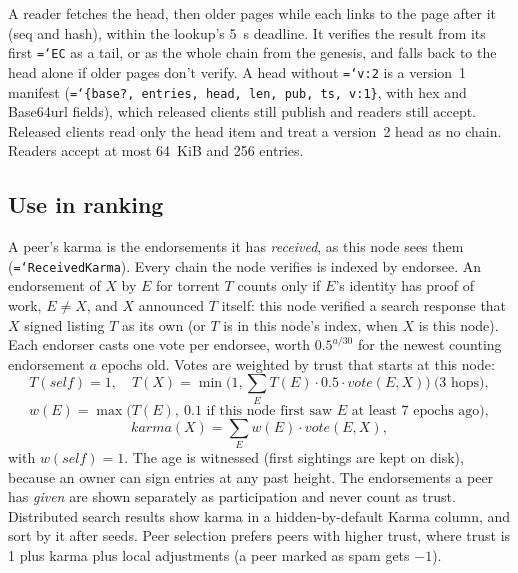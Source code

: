 \documentclass[11pt,a4paper]{article}
\newcommand{\code}[1]{\texttt{\hyphenchar\font=`\-\relax #1}}
\DeclareRobustCommand{\_}{\origunderscore\allowbreak}
\begin{document}
A reader fetches the head, then older pages while each links to the page after it (seq and
hash), within the lookup's 5~s deadline. It verifies the result from its first \code{EC} as a
tail, or as the whole chain from the genesis, and falls back to the head alone if older pages
don't verify. A head without \code{v:2} is a version~1 manifest
(\code{\{base?, entries, head, len, pub, ts, v:1\}}, with hex and Base64url fields), which
released clients still publish and readers still accept. Released clients read only the head
item and treat a version~2 head as no chain. Readers accept at most 64~KiB and 256 entries.

\subsection{Use in ranking}
A peer's karma is the endorsements it has \emph{received}, as this node sees them
(\code{ReceivedKarma}). Every chain the node verifies is indexed by endorsee. An endorsement of
$X$ by $E$ for torrent $T$ counts only if $E$'s identity has proof of work, $E \neq X$, and $X$
announced $T$ itself: this node verified a search response that $X$ signed listing $T$ as its
own (or $T$ is in this node's index, when $X$ is this node). Each endorser casts one vote per
endorsee, worth $0.5^{a/30}$ for the newest counting endorsement $a$ epochs old. Votes are
weighted by trust that starts at this node:
\[
T(\mathit{self}) = 1,\quad
T(X) = \min\Big(1, \sum_E T(E) \cdot 0.5 \cdot \mathit{vote}(E, X)\Big)\ \text{(3 hops)},
\]
\[
w(E) = \max\big(T(E),\ 0.1 \text{ if this node first saw } E \text{ at least 7 epochs ago}\big),
\]
\[
\mathit{karma}(X) = \sum_E w(E) \cdot \mathit{vote}(E, X),
\]
with $w(\mathit{self}) = 1$. The age is witnessed (first sightings are kept on disk), because
an owner can sign entries at any past height. The endorsements a peer has \emph{given} are shown
separately as participation and never count as trust. Distributed search results show karma in
a hidden-by-default Karma column, and sort by it after seeds. Peer selection prefers peers with
higher trust, where trust is 1 plus karma plus local adjustments (a peer marked as spam gets
$-1$).
\end{document}
